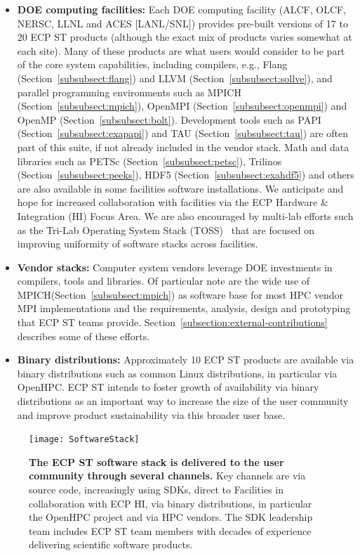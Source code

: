 \begin{itemize}
	\item \textbf{DOE computing facilities:} Each DOE computing facility (ALCF, OLCF, NERSC, LLNL and ACES [LANL/SNL]) provides pre-built versions of 17 to 20 ECP ST products (although the exact mix of products varies somewhat at each site).  Many of these products are what users would consider to be part of the core system capabilities, including compilers, e.g., Flang (Section~\ref{subsubsect:flang}) and LLVM (Section~\ref{subsubsect:sollve}), and parallel programming environments such as MPICH (Section~\ref{subsubsect:mpich}), OpenMPI (Section~\ref{subsubsect:openmpi}) and OpenMP (Section~\ref{subsubsect:bolt}).  Development tools such as PAPI (Section~\ref{subsubsect:exapapi}) and TAU (Section~\ref{subsubsect:tau}) are often part of this suite, if not already included in the vendor stack. Math and data libraries such as PETSc (Section~\ref{subsubsect:petsc}), Trilinos (Section~\ref{subsubsect:peeks}), HDF5 (Section~\ref{subsubsect:exahdf5}) and others are also available in some facilities software installations.  We anticipate and hope for increased collaboration with facilities via the ECP Hardware \& Integration (HI) Focus Area.  We are also encouraged by multi-lab efforts such as the Tri-Lab Operating System Stack (TOSS)~\cite{TOSS} that are focused on improving uniformity of software stacks across facilities.
	\item \textbf{Vendor stacks:} Computer system vendors leverage DOE investments in compilers, tools and libraries.  Of particular note are the wide use of MPICH(Section~\ref{subsubsect:mpich}) as software base for most HPC vendor MPI implementations and the requirements, analysis, design and prototyping that ECP ST teams provide.  Section~\ref{subsection:external-contributions} describes some of these efforts.
	\item \textbf{Binary distributions:} Approximately 10 ECP ST products are available via binary distributions such as common Linux distributions, in particular via OpenHPC\cite{OpenHPC}.  ECP ST intends to foster growth of availability via binary distributions as an important way to increase the size of the user community and improve product sustainability via this broader user base.
\end{itemize}

\begin{figure}
	\centering
	\texttt{[image: SoftwareStack]}
	\caption{\textbf{The ECP ST software stack is delivered to the user community through several channels.} Key channels are via source code, increasingly using SDKs, direct to Facilities in collaboration with ECP HI, via binary distributions, in particular the OpenHPC project and via HPC vendors.  The SDK leadership team includes  ECP ST team members with decades of experience delivering scientific software products.}
	\label{fig:softwarestack}
\end{figure}

